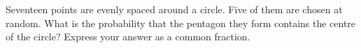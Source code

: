 Seventeen points are evenly spaced around a circle. Five of them are chosen at random. What is the probability that the pentagon they form contains the centre of the circle? Express your answer as a common fraction.
